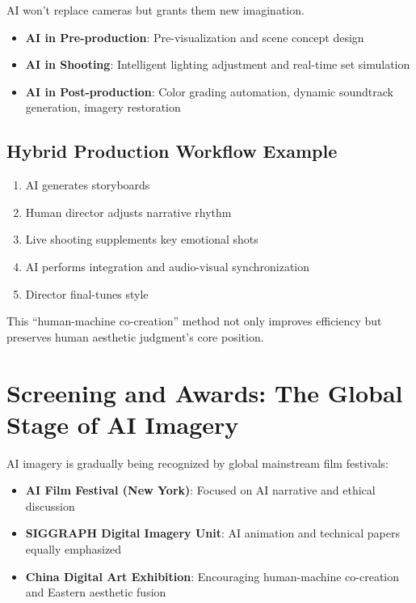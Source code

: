 AI won't replace cameras but grants them new imagination.

\begin{itemize}
\item \textbf{AI in Pre-production}: Pre-visualization and scene concept design
\item \textbf{AI in Shooting}: Intelligent lighting adjustment and real-time set simulation
\item \textbf{AI in Post-production}: Color grading automation, dynamic soundtrack generation, imagery restoration
\end{itemize}

\subsection{Hybrid Production Workflow Example}

\begin{enumerate}
\item AI generates storyboards
\item Human director adjusts narrative rhythm
\item Live shooting supplements key emotional shots
\item AI performs integration and audio-visual synchronization
\item Director final-tunes style
\end{enumerate}

This ``human-machine co-creation'' method not only improves efficiency but preserves human aesthetic judgment's core position.

\section{Screening and Awards: The Global Stage of AI Imagery}
\label{sec:screening-awards}

AI imagery is gradually being recognized by global mainstream film festivals:

\begin{itemize}
\item \textbf{AI Film Festival (New York)}: Focused on AI narrative and ethical discussion
\item \textbf{SIGGRAPH Digital Imagery Unit}: AI animation and technical papers equally emphasized
\item \textbf{China Digital Art Exhibition}: Encouraging human-machine co-creation and Eastern aesthetic fusion
\end{itemize}

